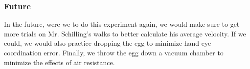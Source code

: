 \documentclass[12pt]{article}
\begin{document}
\subsubsection{Future}

In the future, were we to do this experiment again, we would make sure to get more trials on Mr. Schilling's walks to better calculate his average velocity. If we could, we would also practice dropping the egg to minimize hand-eye coordination error. Finally, we throw the egg down a vacuum chamber to minimize the effects of air resistance.
\end{document}

